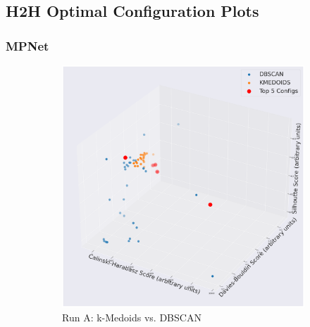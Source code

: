 \documentclass[10pt,oneside]{report}
\begin{document}
\subsection{H2H Optimal Configuration Plots}\label{sec:h2h_config_appendix}
\subsubsection{MPNet}

\begin{figure}[H]
    \centering
    \begin{subfigure}[b]{0.48\textwidth}
        \centering
        \includegraphics[width=\textwidth]{./images/mpnet_kmedoidsvsdbscan.png}
        \caption{Run A: k-Medoids vs. DBSCAN}
        \label{fig:mpnet_kmedoids_vs_dbscan_h2h_config} %
    \end{subfigure}
    \hfill
    \begin{subfigure}[b]{0.48\textwidth}
        \centering

\end{subfigure}
\end{figure}
\end{document}
